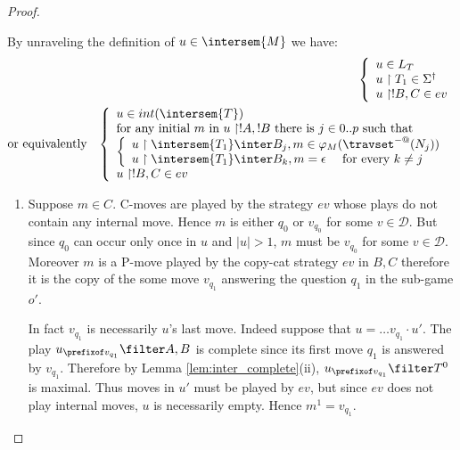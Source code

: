\begin{proof}
\begin{itemize}
    By unraveling the definition of $u \in \intersem{M}$ we have:
    \begin{eqnarray*}
      &&      \left\{
            \begin{array}{ll}
                u \in L_T\\
                u \upharpoonright T_1  \in \Sigma^\dagger \\
                u \upharpoonright !B,C  \in  ev
            \end{array}
            \right. \\
    & \mbox{or equivalently} & \left\{
    \begin{array}{ll}
        u \in int(\intersem{T}) \\
        \hbox{for any initial $m$ in $u \upharpoonright !A,!B$ there is $j \in 0..p$ such that } \\
        \left\{\begin{array}{ll}
            u \upharpoonright \intersem{T_1} \inter B_j, m \in \varphi_{M} (\travset^{-@}(N_j)) \label{eq:def_z} \\
            u \upharpoonright \intersem{T_1} \inter B_k,m = \epsilon \quad \mbox{ for every } k\neq j \label{eq:b}
        \end{array}
        \right. \\
        u \upharpoonright !B,C  \in  ev
    \end{array}
    \right.
    \end{eqnarray*}

    \begin{enumerate}
    \item Suppose $m \in C$. C-moves are played by the strategy $ev$ whose plays do not contain any internal move.
    Hence $m$ is either $q_0$ or $v_{q_0}$ for some
    $v\in\mathcal{D}$. But since $q_0$ can occur only once in
    $u$ and $|u|>1$, $m$ must be $v_{q_0}$ for some
    $v\in \mathcal{D}$.  Moreover $m$ is a P-move played by the
    copy-cat strategy $ev$ in $B,C$ therefore it is the copy
    of the some move $v_{q_1}$ answering the question $q_1$ in the sub-game $o'$.

    In fact $v_{q_1}$ is necessarily $u$'s last move. Indeed
    suppose that $u = \ldots v_{q_1} \cdot u'$. The play
    $u_{\prefixof v_{q_1}}\filter A,B$ is complete since its
    first move $q_1$ is answered by $v_{q_1}$. Therefore by
    Lemma \ref{lem:inter_complete}(ii), $u_{\prefixof
    v_{q_1}}\filter T^0$ is maximal. Thus moves in $u'$ must
    be played by $ev$, but since $ev$ does not play internal
    moves, $u$ is necessarily empty. Hence $m^1=v_{q_1}$.


\end{enumerate}
\end{itemize}
\end{proof}
